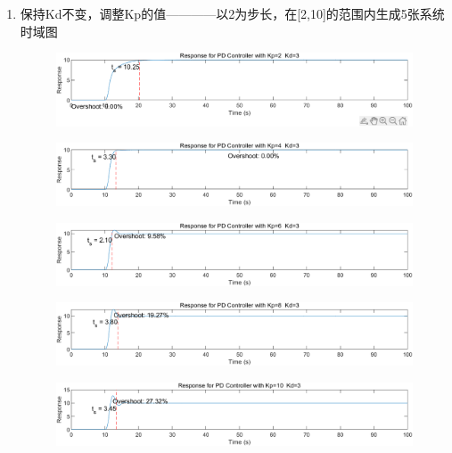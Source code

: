 \documentclass{thuemp}
\begin{document}
\begin{enumerate}
  \item 保持Kd不变，调整Kp的值————以2为步长，在[2,10]的范围内生成5张系统时域图
  \begin{figure}[H]
    \centering
    \includegraphics[width=1\linewidth]{./img/PD/d1.png}
  \end{figure}
  \begin{figure}[H]
    \centering
    \includegraphics[width=1\linewidth]{./img/PD/d2.png}
  \end{figure}
  \begin{figure}[H]
    \centering
    \includegraphics[width=1\linewidth]{./img/PD/d3.png}
  \end{figure}
  \begin{figure}[H]
    \centering
    \includegraphics[width=1\linewidth]{./img/PD/d4.png}
  \end{figure}
  \begin{figure}[H]
    \centering
    \includegraphics[width=1\linewidth]{./img/PD/d5.png}
  \end{figure}

\end{enumerate}
\end{document}

